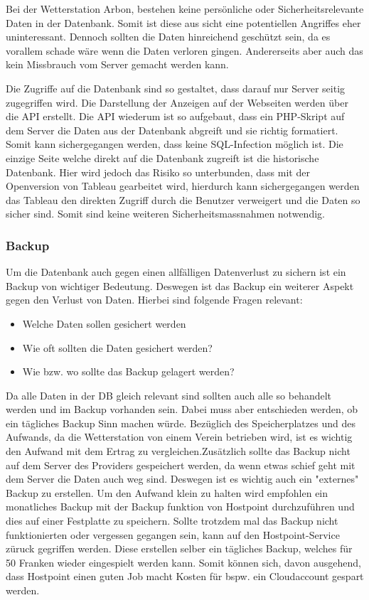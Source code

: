 Bei der Wetterstation Arbon, bestehen keine persönliche oder Sicherheitsrelevante Daten in der Datenbank. Somit ist diese aus sicht eine potentiellen Angriffes eher uninteressant. Dennoch sollten die Daten hinreichend geschützt sein, da es vorallem schade wäre wenn die Daten verloren gingen. Andererseits aber auch das kein Missbrauch vom Server gemacht werden kann. 

Die Zugriffe auf die Datenbank sind so gestaltet, dass darauf nur Server seitig zugegriffen wird. Die Darstellung der Anzeigen auf der Webseiten werden über die API erstellt. Die API wiederum ist so aufgebaut, dass ein PHP-Skript auf dem Server die Daten aus der Datenbank abgreift und sie richtig formatiert. Somit kann sichergegangen werden, dass keine SQL-Infection möglich ist. Die einzige Seite welche direkt auf die Datenbank zugreift ist die historische Datenbank. Hier wird jedoch das Risiko so unterbunden, dass mit der Openversion von Tableau gearbeitet wird, hierdurch kann sichergegangen werden das Tableau den direkten Zugriff durch die Benutzer verweigert und die Daten so sicher sind. Somit sind keine weiteren Sicherheitsmassnahmen notwendig.

\subsubsection{Backup}

Um die Datenbank auch gegen einen allfälligen Datenverlust zu sichern ist ein Backup von wichtiger Bedeutung. Deswegen ist das Backup ein weiterer Aspekt gegen den Verlust von Daten. Hierbei sind folgende Fragen relevant:
\begin{itemize}
\item Welche Daten sollen gesichert werden
\item Wie oft sollten die Daten gesichert werden?
\item Wie bzw. wo sollte das Backup gelagert werden? 
\end{itemize}

Da alle Daten in der DB gleich relevant sind sollten auch alle so behandelt werden und im Backup vorhanden sein. Dabei muss aber entschieden werden, ob ein tägliches Backup Sinn machen würde. Bezüglich des Speicherplatzes und des Aufwands, da die Wetterstation von einem Verein betrieben wird, ist es wichtig den Aufwand mit dem Ertrag zu vergleichen.Zusätzlich sollte das Backup nicht auf dem Server des Providers gespeichert werden, da wenn etwas schief geht mit dem Server die Daten auch weg sind. Deswegen ist es wichtig auch ein "externes" Backup zu erstellen. Um den Aufwand klein zu halten wird empfohlen ein monatliches Backup mit der Backup funktion von Hostpoint durchzuführen und dies auf einer Festplatte zu speichern. Sollte trotzdem mal das Backup nicht funktionierten oder vergessen gegangen sein, kann auf den Hostpoint-Service züruck gegriffen werden. Diese erstellen selber ein tägliches Backup, welches für 50 Franken wieder eingespielt werden kann. Somit können sich, davon ausgehend, dass Hostpoint einen guten Job macht Kosten für bspw. ein Cloudaccount gespart werden.


